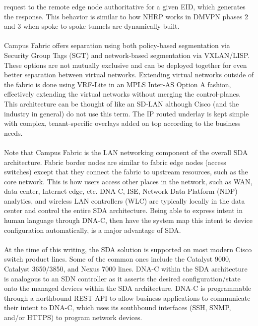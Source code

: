 request to the remote edge node authoritative for a given EID, which generates
the response. This behavior is similar to how NHRP works in DMVPN phases 2 and
3 when spoke-to-spoke tunnels are dynamically built.
\\ \\
Campus Fabric offers separation using both policy-based segmentation via
Security Group Tags (SGT) and network-based segmentation via VXLAN/LISP. These
options are not mutually exclusive and can be deployed together for even
better separation between virtual networks. Extending virtual networks outside
of the fabric is done using VRF-Lite in an MPLS Inter-AS Option A fashion,
effectively extending the virtual networks without merging the control-planes.
This architecture can be thought of like an SD-LAN although Cisco (and the
industry in general) do not use this term. The IP routed underlay is kept
simple with complex, tenant-specific overlays added on top according to the
business needs.
\\ \\
Note that Campus Fabric is the LAN networking component of the overall SDA
architecture. Fabric border nodes are similar to fabric edge nodes (access
switches) except that they connect the fabric to upstream resources, such as
the core network. This is how users access other places in the network, such
as WAN, data center, Internet edge, etc. DNA-C, ISE, Network Data Platform
(NDP) analytics, and wireless LAN controllers (WLC) are typically locally in
the data center and control the entire SDA architecture. Being able to express
intent in human language through DNA-C, then have the system map this intent
to device configuration automatically, is a major advantage of SDA.
\\ \\
At the time of this writing, the SDA solution is supported on most modern
Cisco switch product lines. Some of the common ones include the Catalyst 9000,
Catalyst 3650/3850, and Nexus 7000 lines. DNA-C within the SDA architecture is
analogous to an SDN controller as it asserts the desired configuration/state
onto the managed devices within the SDA architecture. DNA-C is programmable
through a northbound REST API to allow business applications to communicate
their intent to DNA-C, which uses its southbound interfaces (SSH, SNMP, and/or
HTTPS) to program network devices.

